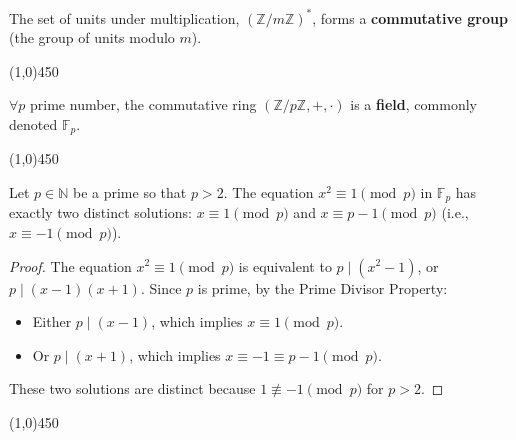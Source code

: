 \begin{proposition}
The set of units under multiplication, $(\mathbb{Z}/m\mathbb{Z})^*$, forms a \textbf{commutative group} (the group of units modulo $m$).
\end{proposition}

\begin{center}
    \vspace{10pt}
    \line(1,0){450}
    \vspace{25pt}
\end{center}

\begin{proposition}
$\forall p$ prime number, the commutative ring $(\mathbb{Z}/p\mathbb{Z}, +, \cdot)$ is a \textbf{field}, commonly denoted $\mathbb{F}_p$.
\end{proposition}

\begin{center}
    \vspace{10pt}
    \line(1,0){450}
    \vspace{25pt}
\end{center}

\begin{corollary}
Let $p \in \mathbb{N}$ be a prime so that $p > 2$. The equation $x^2 \equiv 1 \pmod{p}$ in $\mathbb{F}_p$ has exactly two distinct solutions: $x \equiv 1 \pmod{p}$ and $x \equiv p-1 \pmod{p}$ (i.e., $x \equiv -1 \pmod{p}$).
\end{corollary}
\begin{proof}
The equation $x^2 \equiv 1 \pmod{p}$ is equivalent to $p \mid (x^2 - 1)$, or $p \mid (x - 1)(x + 1)$.
Since $p$ is prime, by the Prime Divisor Property:
\begin{itemize}
    \item Either $p \mid (x - 1)$, which implies $x \equiv 1 \pmod{p}$.
    \item Or $p \mid (x + 1)$, which implies $x \equiv -1 \equiv p-1 \pmod{p}$.
\end{itemize}
These two solutions are distinct because $1 \not\equiv -1 \pmod{p}$ for $p > 2$. \qedhere
\end{proof}

\begin{center}
    \vspace{10pt}
    \line(1,0){450}
    \vspace{25pt}
\end{center}